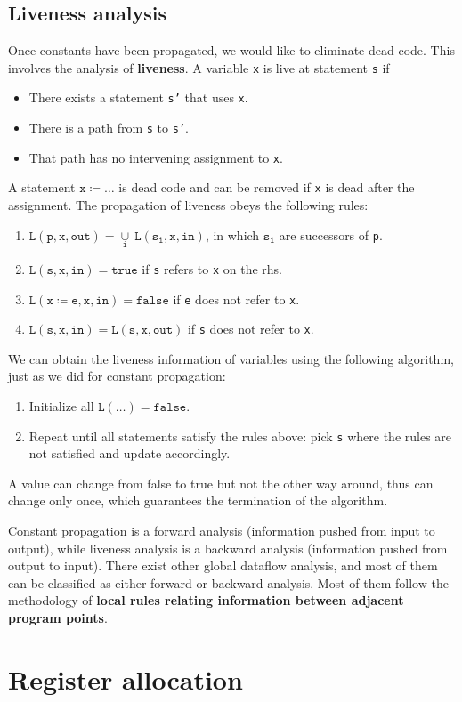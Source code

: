 \subsection{Liveness analysis}
Once constants have been propagated, we would like to eliminate dead code. This involves the analysis of \textbf{liveness}. A variable \texttt{x} is live at statement \texttt{s} if 
\begin{itemize}
\item There exists a statement \texttt{s'} that uses \texttt{x}.
\item There is a path from \texttt{s} to \texttt{s'}.
\item That path has no intervening assignment to \texttt{x}.
\end{itemize}
A statement $\mathtt{x\coloneqq \dots}$ is dead code and can be removed if \texttt{x} is dead after the assignment. The propagation of liveness obeys the following rules:
\begin{enumerate}
\item $\mathtt{L(p,x,out) = \underset{i}{\cup}\:L(s_i,x,in)}$, in which $\mathtt{s_i}$ are successors of \texttt{p}.
\item $\mathtt{L(s,x,in)=true}$ if \texttt{s} refers to \texttt{x} on the rhs.
\item $\mathtt{L(x\coloneqq e,x,in)=false}$ if \texttt{e} does not refer to \texttt{x}.
\item $\mathtt{L(s,x,in)=L(s,x,out)}$ if \texttt{s} does not refer to \texttt{x}.
\end{enumerate}
We can obtain the liveness information of variables using the following algorithm, just as we did for constant propagation:
\begin{enumerate}
\item Initialize all $\mathtt{L(\dots)=false}$.
\item Repeat until all statements satisfy the rules above: pick \texttt{s} where the rules are not satisfied and update accordingly.
\end{enumerate}
A value can change from false to true but not the other way around, thus can change only once, which guarantees the termination of the algorithm.

Constant propagation is a forward analysis (information pushed from input to output), while liveness analysis is a backward analysis (information pushed from output to input). There exist other global dataflow analysis, and most of them can be classified as either forward or backward analysis. Most of them follow the methodology of \textbf{local rules relating information between adjacent program points}. 
\section{Register allocation}
\ifx\PREAMBLE\undefined

\fi